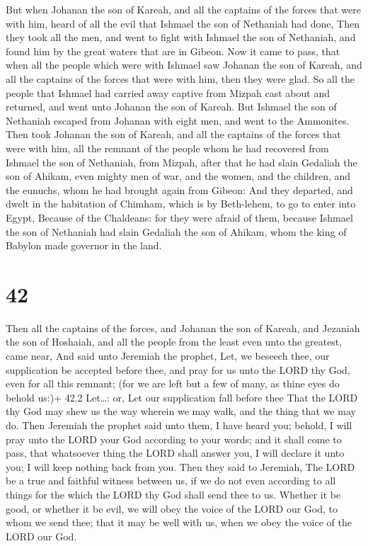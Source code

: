  But when Johanan the son of Kareah, and all the captains
of the forces that were with him, heard of all the evil that Ishmael the
son of Nethaniah had done,  Then they took all the men, and
went to fight with Ishmael the son of Nethaniah, and found him by the
great waters that are in Gibeon.  Now it came to pass, that
when all the people which were with Ishmael saw Johanan the son of
Kareah, and all the captains of the forces that were with him, then they
were glad.  So all the people that Ishmael had carried away
captive from Mizpah cast about and returned, and went unto Johanan the
son of Kareah.  But Ishmael the son of Nethaniah escaped
from Johanan with eight men, and went to the Ammonites. 
Then took Johanan the son of Kareah, and all the captains of the forces
that were with him, all the remnant of the people whom he had recovered
from Ishmael the son of Nethaniah, from Mizpah, after that he had slain
Gedaliah the son of Ahikam, even mighty men of war, and the women, and
the children, and the eunuchs, whom he had brought again from Gibeon:
 And they departed, and dwelt in the habitation of Chimham,
which is by Beth-lehem, to go to enter into Egypt,  Because
of the Chaldeans: for they were afraid of them, because Ishmael the son
of Nethaniah had slain Gedaliah the son of Ahikam, whom the king of
Babylon made governor in the land.

\hypertarget{section-41}{%
\section{42}\label{section-41}}

 Then all the captains of the forces, and Johanan the son of
Kareah, and Jezaniah the son of Hoshaiah, and all the people from the
least even unto the greatest, came near,  And said unto
Jeremiah the prophet, Let, we beseech thee, our supplication be accepted
before thee, and pray for us unto the LORD thy God, even for all this
remnant; (for we are left but a few of many, as thine eyes do behold
us:)+ 42.2 Let\ldots: or, Let our supplication fall before thee
 That the LORD thy God may shew us the way wherein we may
walk, and the thing that we may do.  Then Jeremiah the
prophet said unto them, I have heard you; behold, I will pray unto the
LORD your God according to your words; and it shall come to pass, that
whatsoever thing the LORD shall answer you, I will declare it unto you;
I will keep nothing back from you.  Then they said to
Jeremiah, The LORD be a true and faithful witness between us, if we do
not even according to all things for the which the LORD thy God shall
send thee to us.  Whether it be good, or whether it be evil,
we will obey the voice of the LORD our God, to whom we send thee; that
it may be well with us, when we obey the voice of the LORD our God.

